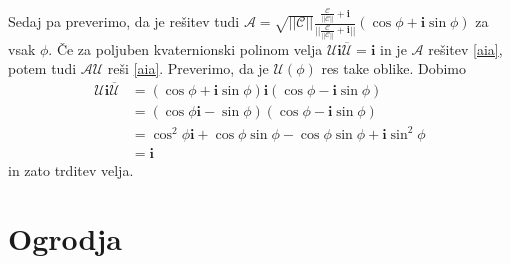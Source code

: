 \documentclass[mat1]{fmfdelo}
\newcommand{\ii}{\boldsymbol i}
\newcommand{\A}{\mathcal A}
\newcommand{\CC}{\mathcal C}
\begin{document}
\begin{dokaz}
	Sedaj pa preverimo, da je rešitev tudi $\A = \sqrt{||\CC||} \frac{\frac{\CC}{||\CC||} + \ii}{||\frac{\CC}{||\CC||} + \ii||}\left(\cos \phi + \ii \sin \phi \right)$ za vsak $\phi$.	Če za poljuben kvaternionski polinom velja $\mathcal{U} \ii \overline{\mathcal{U}} = \ii$ in je $\A$ rešitev
	\ref{aia}, potem tudi $\A \mathcal{U}$ reši \ref{aia}. Preverimo, da je $\mathcal{U}(\phi)$ res take oblike. Dobimo
	\begin{equation*}
	\begin{split}
		\mathcal{U}\ii\overline{\mathcal{U}} &= (\cos\phi + \ii\sin\phi) \ii (\cos\phi-\ii\sin\phi) \\
		&=(\cos\phi \ii - \sin\phi)(\cos\phi-\ii\sin\phi) \\
		&= \cos^2\phi \ii +\cos\phi\sin\phi - \cos\phi\sin\phi +\ii\sin^2\phi\\
		&= \ii
	\end{split}
	\end{equation*}
	in zato trditev velja.
\end{dokaz}
\section{Ogrodja}
\end{document}
